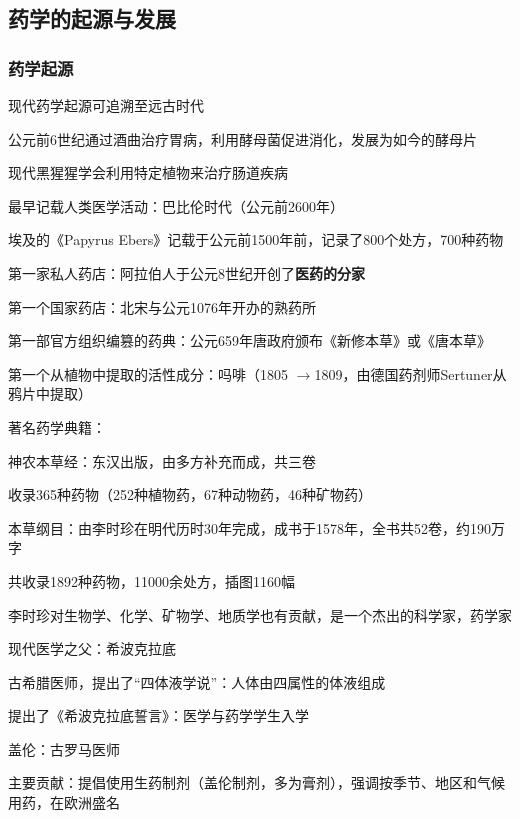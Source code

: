 \subsection{药学的起源与发展}%
\label{sub:药学的起源与发展}
\subsubsection{药学起源}%
\label{subsub:药学起源}
现代药学起源可追溯至远古时代
\begin{eg}
    公元前6世纪通过酒曲治疗胃病，利用酵母菌促进消化，发展为如今的酵母片
\end{eg}
\begin{eg}
    现代黑猩猩学会利用特定植物来治疗肠道疾病
\end{eg}
\begin{notation}
    最早记载人类医学活动：巴比伦时代（公元前2600年）

    埃及的《Papyrus Ebers》记载于公元前1500年前，记录了800个处方，700种药物

    第一家私人药店：阿拉伯人于公元8世纪开创了\textbf{医药的分家}

    第一个国家药店：北宋与公元1076年开办的熟药所

    第一部官方组织编篡的药典：公元659年唐政府颁布《新修本草》或《唐本草》

    第一个从植物中提取的活性成分：吗啡（1805 $\to $1809，由德国药剂师Sertuner从鸦片中提取）
\end{notation}
著名药学典籍：
\begin{notation}
    神农本草经：东汉出版，由多方补充而成，共三卷

    收录365种药物（252种植物药，67种动物药，46种矿物药）
\end{notation}
\begin{notation}
    本草纲目：由李时珍在明代历时30年完成，成书于1578年，全书共52卷，约190万字

    共收录1892种药物，11000余处方，插图1160幅
\end{notation}
李时珍对生物学、化学、矿物学、地质学也有贡献，是一个杰出的科学家，药学家
\begin{notation}
    现代医学之父：希波克拉底

    古希腊医师，提出了“四体液学说”：人体由四属性的体液组成

    提出了《希波克拉底誓言》：医学与药学学生入学
\end{notation}
\begin{notation}
    盖伦：古罗马医师

    主要贡献：提倡使用生药制剂（盖伦制剂，多为膏剂），强调按季节、地区和气候用药，在欧洲盛名
\end{notation}
